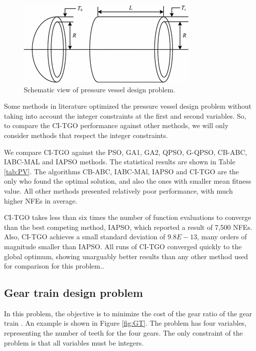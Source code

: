 \begin{figure}[h]
\begin{center}
\includegraphics[scale=0.6]{Imgs/PV.png}
\end{center}
\captionsetup{justification=centering}
\caption{Schematic view of pressure vessel design problem.}\label{fig:PV}
\end{figure}


Some methods in literature optimized the pressure vessel design problem without taking into account the integer constraints at the first and second variables. So, to compare the CI-TGO performance against other methods, we will only consider methods that respect the integer constraints.



We compare CI-TGO against the PSO, GA1, GA2, QPSO, G-QPSO, CB-ABC, IABC-MAL and IAPSO methods. The statistical results are shown in Table \ref{tab:PV}. The algorithms CB-ABC, IABC-MAl, IAPSO and CI-TGO are the only who found the optimal solution, and also the ones with smaller mean fitness value. All other methods presented relatively poor performance, with much higher NFEs in average.

CI-TGO takes less than six times the number of function evaluations to converge than the best competing method, IAPSO, which reported a result of 7,500 NFEs. Also, CI-TGO achieves a small standard deviation of $9.8E-13$, many orders of magnitude smaller than IAPSO. All runs of CI-TGO converged quickly to the global optimum, showing unarguably better results than any other method used for comparison for this problem..



\subsection{Gear train design problem}

In this problem, the objective is to minimize the cost of the gear ratio of the gear train \citep{PV}. An example is shown in Figure \ref{fig:GT}. The problem has four variables, representing the number of teeth for the four gears. The only constraint of the problem is that all variables must be integers.


